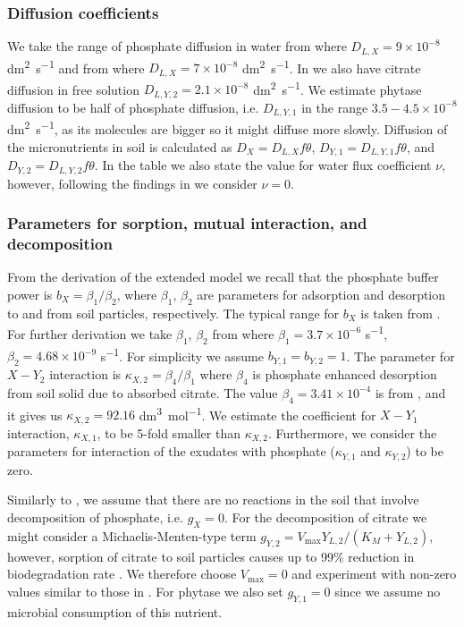 \documentclass[11pt]{article}
\numberwithin{equation}{section}
\begin{document}
\subsubsection{Diffusion coefficients}
We take the range of phosphate diffusion in water from \cite{Ptashnyk-2010} where $D_{L,X} = 9 \times 10^{-8}$ \si{dm^2 .s^{-1}} and from \cite{McKayFletcher-2019} where $D_{L,X} = 7 \times 10^{-8}$ \si{dm^2.s^{-1}}. In \cite{McKayFletcher-2019} we also have citrate diffusion in free solution $D_{L,Y,2} = 2.1 \times 10^{-8}$ \si{dm^2.s^{-1}}. We estimate phytase diffusion to be half of phosphate diffusion, i.e. $D_{L,Y,1}$ in the range $3.5-4.5 \times 10^{-8}$ \si{dm^2.s^{-1}}, as its molecules are bigger so it might diffuse more slowly. Diffusion of the micronutrients in soil is calculated as $D_X = D_{L,X} f \theta$, $D_{Y,1} = D_{L,Y,1} f \theta$, and $D_{Y,2} = D_{L,Y,2}f\theta$. In the table we also state the value for water flux coefficient $\nu$, however, following the findings in \cite{Ptashnyk-2011} we consider $\nu=0$. 

\subsubsection{Parameters for sorption, mutual interaction, and decomposition}
From the derivation of the extended model we recall that the phosphate buffer power is $b_X = \beta_1 / \beta_2$, where $\beta_1$, $\beta_2$ are parameters for adsorption and desorption to and from soil particles, respectively. The typical range for $b_X$ is taken from \cite{Ptashnyk-2010}. For further derivation we take $\beta_1$, $\beta_2$ from \cite{Ptashnyk-2010} where $\beta_1 = 3.7 \times 10^{-6}$ \si{s^{-1}}, $\beta_2 = 4.68 \times 10^{-9}$ \si{s^{-1}}. For simplicity we assume $b_{Y,1}=b_{Y,2} = 1$. The parameter for $X-Y_2$ interaction is $\kappa_{X,2} = \beta_4 / \beta_1$ where $\beta_4$ is phosphate enhanced desorption from soil solid due to absorbed citrate. The value $\beta_4 = 3.41 \times 10^{-4}$ is from \cite{McKayFletcher-2019}, and it gives us $\kappa_{X,2} = 92.16$ \si{dm^3. mol^{-1}}. We estimate the coefficient for $X-Y_1$ interaction, $\kappa_{X,1}$, to be 5-fold smaller than $\kappa_{X,2}$. Furthermore, we consider the parameters for interaction of the exudates with phosphate ($\kappa_{Y,1}$ and $\kappa_{Y,2}$) to be zero. 

Similarly to \cite{Ptashnyk-2011}, we assume that there are no reactions in the soil that involve decomposition of phosphate, i.e. $g_X = 0$. For the decomposition of citrate we might consider a Michaelis-Menten-type term $g_{Y,2} = V_{\max} Y_{L,2} / (K_M + Y_{L,2})$, however, sorption of citrate to soil particles causes up to 99\% reduction in biodegradation rate \cite{McKayFletcher-2019}. We therefore choose $V_{\max} = 0$ and experiment with non-zero values similar to those in \cite{Ptashnyk-2011}. For phytase we also set $g_{Y,1} = 0$ since we assume no microbial consumption of this nutrient.
\end{document}
